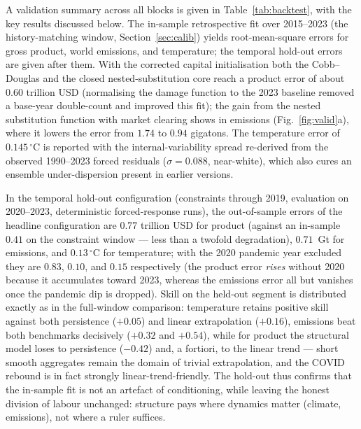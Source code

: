 \documentclass[a4paper,fleqn]{cas-sc}
\newcommand{\response}[1]{\medskip\noindent\textcolor{blue}{\small\itshape [Addressed: #1]}\medskip}
\begin{document}

A validation summary across all blocks is given in Table~\ref{tab:backtest}, with the key results
discussed below. The in-sample retrospective fit over 2015--2023 (the history-matching window,
Section~\ref{sec:calib}) yields root-mean-square errors for gross product, world emissions,
and temperature; the temporal hold-out errors are given after them. With the corrected capital initialisation both the
Cobb--Douglas and the closed nested-substitution core reach a product error of about $0.60$ trillion
USD (normalising the damage function to the 2023 baseline removed a base-year double-count and
improved this fit); the gain from the nested substitution function with market clearing shows in
emissions (Fig.~\ref{fig:valid}a), where it lowers the error from $1.74$ to $0.94$ gigatons. The
temperature error of $0.145\,^\circ$C is reported with the internal-variability spread re-derived
from the observed 1990--2023 forced residuals ($\sigma=0.088$, near-white), which also cures an
ensemble under-dispersion present in earlier versions.

In the temporal hold-out configuration (constraints through 2019, evaluation on 2020--2023,
deterministic forced-response runs), the out-of-sample errors of the headline configuration are
$0.77$ trillion USD for product (against an in-sample $0.41$ on the constraint window --- less
than a twofold degradation), $0.71$~Gt for emissions, and $0.13\,^\circ$C for temperature; with
the 2020 pandemic year excluded they are $0.83$, $0.10$, and $0.15$ respectively (the product
error \emph{rises} without 2020 because it accumulates toward 2023, whereas the emissions error
all but vanishes once the pandemic dip is dropped). Skill on the held-out segment is
distributed exactly as in the full-window comparison: temperature retains positive skill against
both persistence ($+0.05$) and linear extrapolation ($+0.16$), emissions beat both benchmarks
decisively ($+0.32$ and $+0.54$), while for product the structural model loses to persistence
($-0.42$) and, a fortiori, to the linear trend --- short smooth aggregates remain the domain of
trivial extrapolation, and the COVID rebound is in fact strongly linear-trend-friendly. The
hold-out thus confirms that the in-sample fit is not an artefact of conditioning, while leaving
the honest division of labour unchanged: structure pays where dynamics matter (climate,
emissions), not where a ruler suffices.
\end{document}
